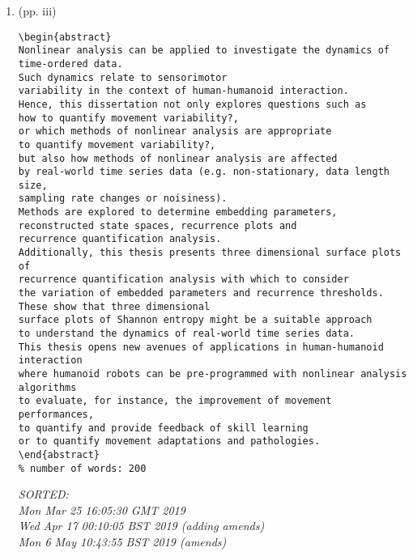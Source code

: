 \documentclass[12pt]{article}
\begin{document}
\begin{enumerate}

\item  (pp. iii)  \\ 


\begin{verbatim}
\begin{abstract}
Nonlinear analysis can be applied to investigate the dynamics of time-ordered data.
Such dynamics relate to sensorimotor 
variability in the context of human-humanoid interaction.
Hence, this dissertation not only explores questions such as 
how to quantify movement variability?, 
or which methods of nonlinear analysis are appropriate 
to quantify movement variability?, 
but also how methods of nonlinear analysis are affected 
by real-world time series data (e.g. non-stationary, data length size, 
sampling rate changes or noisiness).
Methods are explored to determine embedding parameters, 
reconstructed state spaces, recurrence plots and 
recurrence quantification analysis. 
Additionally, this thesis presents three dimensional surface plots of 
recurrence quantification analysis with which to consider 
the variation of embedded parameters and recurrence thresholds.
These show that three dimensional 
surface plots of Shannon entropy might be a suitable approach 
to understand the dynamics of real-world time series data. 
This thesis opens new avenues of applications in human-humanoid interaction
where humanoid robots can be pre-programmed with nonlinear analysis algorithms 
to evaluate, for instance, the improvement of movement performances,
to quantify and provide feedback of skill learning
or to quantify movement adaptations and pathologies.
\end{abstract}
% number of words: 200 

	\end{verbatim}
	\textit{
	SORTED: \\ 
	Mon Mar 25 16:05:30 GMT 2019 \\ 
 	Wed Apr 17 00:10:05 BST 2019 (adding amends) \\
	Mon  6 May 10:43:55 BST 2019 (amends)
	}
	\\



\end{enumerate}
\end{document}
